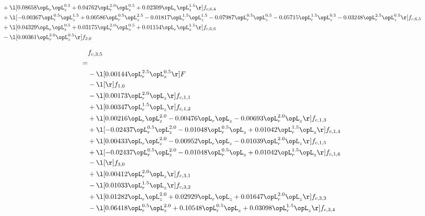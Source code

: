 \begin{alignat}{2}
& + \l[  0.08658 \opL_r \opL_z^{0.5} +  0.04762 \opL_r^{2.0} \opL_z^{0.5} +  0.02309 \opL_r \opL_z^{1.5}  \r] f_{c,6,4} \nonumber \\ 
& + \l[  -0.00367 \opL_r^{0.5} \opL_z^{1.5} +  0.00586 \opL_r^{0.5} \opL_z^{2.5}   -0.01817 \opL_r^{1.5} \opL_z^{1.5}   -0.07987 \opL_r^{0.5} \opL_z^{0.5}   -0.05715 \opL_r^{1.5} \opL_z^{0.5}   -0.03248 \opL_r^{2.5} \opL_z^{0.5}  \r] f_{c,6,5} \nonumber \\ 
& + \l[  0.04329 \opL_r \opL_z^{0.5} +  0.03175 \opL_r^{2.0} \opL_z^{0.5} +  0.01154 \opL_r \opL_z^{1.5}  \r] f_{c,6,6} \nonumber \\ 
& - \l[  0.00361 \opL_r^{2.0} \opL_z^{0.5}  \r] f_{2,0} \nonumber \\ 
\end{alignat} 


\begin{alignat}{2} 
\label{eq:f_35_1} 
& f_{c,3,5} \nonumber \\ 
 = \\ 
& - \l[  0.00144 \opL_r^{2.5} \opL_z^{0.5}  \r] F \nonumber \\ 
& - \l[  \r] f_{1,0} \nonumber \\ 
& - \l[  0.00173 \opL_r^{2.0} \opL_z  \r] f_{c,1,1} \nonumber \\ 
& + \l[  0.00347 \opL_r^{1.5} \opL_z  \r] f_{c,1,2} \nonumber \\ 
& + \l[  0.00216 \opL_r \opL_z^{2.0}   -0.00476 \opL_r \opL_z   -0.00693 \opL_r^{2.0} \opL_z  \r] f_{c,1,3} \nonumber \\ 
& + \l[  -0.02437 \opL_r^{0.5} \opL_z^{2.0}   -0.01048 \opL_r^{0.5} \opL_z +  0.01042 \opL_r^{1.5} \opL_z  \r] f_{c,1,4} \nonumber \\ 
& + \l[  0.00433 \opL_r \opL_z^{2.0}   -0.00952 \opL_r \opL_z   -0.01039 \opL_r^{2.0} \opL_z  \r] f_{c,1,5} \nonumber \\ 
& + \l[  -0.02437 \opL_r^{0.5} \opL_z^{2.0}   -0.01048 \opL_r^{0.5} \opL_z +  0.01042 \opL_r^{1.5} \opL_z  \r] f_{c,1,6} \nonumber \\ 
& - \l[  \r] f_{3,0} \nonumber \\ 
& + \l[  0.00412 \opL_r^{2.0} \opL_z  \r] f_{c,3,1} \nonumber \\ 
& - \l[  0.01033 \opL_r^{1.5} \opL_z  \r] f_{c,3,2} \nonumber \\ 
& + \l[  0.01282 \opL_r \opL_z^{2.0} +  0.02929 \opL_r \opL_z +  0.01647 \opL_r^{2.0} \opL_z  \r] f_{c,3,3} \nonumber \\ 
& - \l[  0.06418 \opL_r^{0.5} \opL_z^{2.0} +  0.10548 \opL_r^{0.5} \opL_z +  0.03098 \opL_r^{1.5} \opL_z  \r] f_{c,3,4} \nonumber \\ 

\end{alignat}
